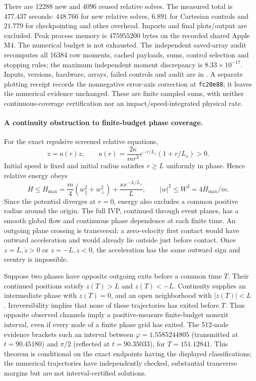 \documentclass[11pt,letterpaper]{article}
\begin{document}
There are 12288 new and 4096 reused relative solves. The measured total is
$477.437$ seconds: $448.766$ for new relative solves, $6.891$ for Cartesian
controls and $21.779$ for checkpointing and other overhead. Imports and final
plots/output are excluded. Peak process memory is $475955200$ bytes on the
recorded shared Apple M4. The numerical budget is not exhausted.
The independent saved-array audit recomputes all 16384 row moments, cached
payloads, sums, control selection and stopping rules; the maximum independent
moment discrepancy is $8.33\times10^{-17}$. Inputs, versions, hardware,
arrays, failed controls and audit are in
.
A separate plotting receipt records the nonnegative error-axis correction
at \texttt{fc20e88}; it leaves the numerical evidence unchanged.
These are finite sampled sums, with neither continuous-coverage certification
nor an impact/speed-integrated physical rate.

\paragraph{A continuity obstruction to finite-budget phase coverage.}
For the exact repulsive screened relative equations,
\begin{equation}
 \ddot z=a(r)z,\qquad
 a(r)=\frac{2\kappa}{m r^3}e^{-r/L_s}(1+r/L_s)>0.
\end{equation}
Initial speed is fixed and initial radius satisfies $r\ge L$ uniformly in
phase. Hence relative energy obeys
\begin{equation}
 H\le H_{\max}=\frac m4(w_\parallel^2+w_\perp^2)
       +\frac{\kappa e^{-L/L_s}}L,
 \qquad |w|^2\le W^2=4H_{\max}/m.
\end{equation}
Since the potential diverges at $r=0$, energy also excludes a common positive
radius around the origin. The full IVP, continued through event planes, has
a smooth global flow and continuous phase dependence at each finite time.
An outgoing plane crossing is transversal: a zero-velocity first contact
would have outward acceleration and would already lie outside just before
contact. Once $z=L,\dot z>0$ or $z=-L,\dot z<0$, the acceleration has the
same outward sign and reentry is impossible.

Suppose two phases have opposite outgoing exits before a common time $T$.
Their continued positions satisfy $z(T)>L$ and $z(T)<-L$. Continuity supplies
an intermediate phase with $z(T)=0$, and an open neighborhood with
$|z(T)|<L$. Irreversibility implies that none of these trajectories has
exited before $T$. Thus opposite observed channels imply a positive-measure
finite-budget nonexit interval, even if every node of a finite phase grid
has exited. The 512-node evidence brackets such an interval between
$\varphi=1.5585244805$ (transmitted at $t=90.45180$) and $\pi/2$
(reflected at $t=90.35033$), for $T=151.12841$.
This theorem is conditional on the exact endpoints having the displayed
classifications; the numerical trajectories have independently checked,
substantial transverse margins but are not interval-certified solutions.
\end{document}
